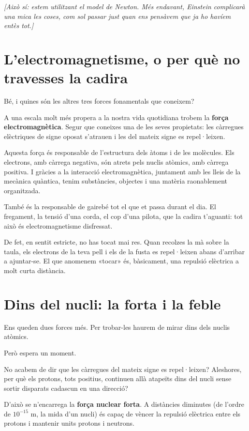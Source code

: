 \textit{[Això sí: estem utilitzant el model de Newton. Més endavant, Einstein complicarà una mica les coses, com sol passar just quan ens pensàvem que ja ho havíem entès tot.]}

\section{L'electromagnetisme, o per què no travesses la cadira}

Bé, i quines són les altres tres forces fonamentals que coneixem?

A una escala molt més propera a la nostra vida quotidiana trobem la \textbf{força electromagnètica}. Segur que coneixes una de les seves propietats: les càrregues elèctriques de signe oposat s'atrauen i les del mateix signe es repel·leixen.

Aquesta força és responsable de l'estructura dels àtoms i de les molècules. Els electrons, amb càrrega negativa, són atrets pels nuclis atòmics, amb càrrega positiva. I gràcies a la interacció electromagnètica, juntament amb les lleis de la mecànica quàntica, tenim substàncies, objectes i una matèria raonablement organitzada.

També és la responsable de gairebé tot el que et passa durant el dia. El fregament, la tensió d'una corda, el cop d'una pilota, que la cadira t'aguanti: tot això és electromagnetisme disfressat.

De fet, en sentit estricte, no has tocat mai res. Quan recolzes la mà sobre la taula, els electrons de la teva pell i els de la fusta es repel·leixen abans d'arribar a ajuntar-se. El que anomenem «tocar» és, bàsicament, una repulsió elèctrica a molt curta distància.

\section{Dins del nucli: la forta i la feble}

Ens queden dues forces més. Per trobar-les haurem de mirar dins dels nuclis atòmics.

Però espera un moment.

No acabem de dir que les càrregues del mateix signe es repel·leixen? Aleshores, per què els protons, tots positius, continuen allà atapeïts dins del nucli sense sortir disparats cadascun en una direcció?

D'això se n'encarrega la \textbf{força nuclear forta}. A distàncies diminutes (de l'ordre de \(10^{-15}\) m, la mida d'un nucli) és capaç de vèncer la repulsió elèctrica entre els protons i mantenir units protons i neutrons.

